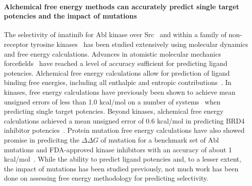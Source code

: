 \documentclass[9pt,lineno]{elife-modified} %
\begin{document}
\paragraph{Alchemical free energy methods can accurately predict single target potencies and the impact of mutations}
 The selectivity of imatinib for Abl kinase over Src~\citep{Lin2013-ft,Lin2014-iv} and within a family of non-receptor tyrosine kinases~\citep{Lin2013-mu} has been studied extensively using molecular dynamics and free energy calculations. Advances in atomistic molecular mechanics forcefields~\citep{Huang:J.Comput.Chem.:2013,Maier:J.Chem.TheoryComput.:2015,Harder:J.Chem.TheoryComput.:2016,Cournia:2017ip} have reached a level of accuracy  sufficient for predicting ligand potencies. Alchemical free energy calculations allow for prediction of ligand binding free energies, including all enthalpic and entropic contributions~\citep{Chodera2011-jn}. In kinases, free energy calculations have previously been shown to achieve mean unsigned errors of less than 1.0 kcal/mol on a number of systems~\citep{Wang:J.Am.Chem.Soc.:2015,Abel:Curr.Opin.Struct.Biol.:2017,abel2017accelerating} when predicting single target potencies. Beyond kinases, alchemical free energy calculations achieved a mean unsigned error of 0.6 kcal/mol in predicting BRD4 inhibitor potencies~\citep{Aldeghi2015-lf}. Protein mutation free energy calculations have also showed promise in predicitng the $\Delta \Delta G$ of mutation for a benchmark set of Abl mutations and FDA-approved kinase inhibitors with an accuracy of about 1 kcal/mol~\citep{Hauser:2018vz}.  While the ability to predict ligand potencies and, to a lesser extent, the impact of mutations has been studied previously, not much work has been done on assessing free energy methodology for predicting selectivity. 
\end{document}
